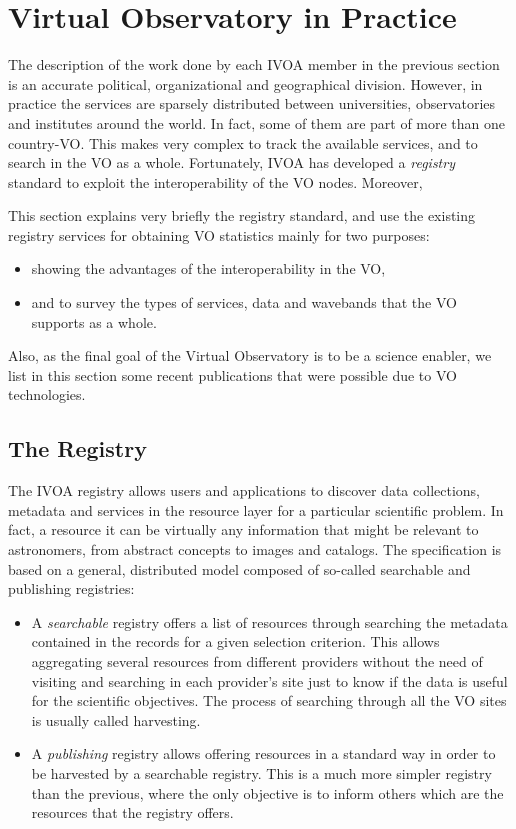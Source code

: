 \section{Virtual Observatory in Practice}
\label{sec:registry}

The description of the work done by each IVOA member
in the previous section is an accurate political, organizational 
and geographical division. However, in practice the services
are sparsely distributed between universities, observatories
and institutes around the world. In fact, some of them 
are part of more than one country-VO. 
This makes very complex to track the available services, 
and to search in the VO as a whole. Fortunately, 
IVOA has developed a \emph{registry} standard to 
exploit the interoperability of the VO nodes.
Moreover, 

This section explains very briefly the registry standard,
and use the existing registry services for obtaining VO 
statistics mainly for two purposes:
\begin{itemize}
\item showing the advantages of the interoperability in the VO,
\item and to survey the types of services, data and wavebands that
the VO supports as a whole.
\end{itemize}
Also, as the final goal of the Virtual Observatory is to be a science enabler,
we list in this section some recent publications that were possible due to
VO technologies.

\subsection{The Registry}

The IVOA registry allows users and applications to discover data collections,
metadata and services in the resource layer for a particular scientific
problem. In fact, a resource it can be virtually any information that might be
relevant to astronomers, from abstract concepts to images and catalogs. 
The specification is based on a general, distributed model composed of
so-called searchable and publishing registries:
\begin{itemize}
\item A \emph{searchable} registry offers a list of resources through searching the 
metadata contained in the records for a given selection criterion.
This allows aggregating several resources from different providers 
without the need of visiting and searching in each provider's site just to
know if the data is useful for the scientific objectives.
The process of searching through all the VO sites is usually called harvesting.
\item A \emph{publishing} registry allows offering resources in a standard way
in order to be harvested by a searchable registry. This is a much more
simpler registry than the previous, where the only objective is to 
inform others which are the resources that the registry offers.
\end{itemize}


